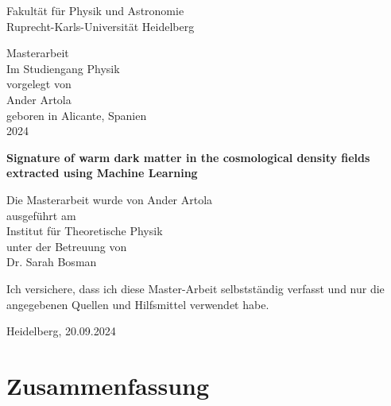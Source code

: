 \documentclass[
     12pt,                    %
     a4paper,             %
     BCOR=10mm,     %
     DIV=14,                 %
     listof=totoc,                    %
     bibliography=totoc,       %
     index=totoc,              %
     twoside,
     headsepline
     ]{scrreprt}
\begin{document}


\thispagestyle{empty}
\begin{center}
  \renewcommand{\baselinestretch}{2.00}
  \Large\sffamily
  Fakult\"{a}t f\"{u}r Physik und Astronomie\\
  \large
  Ruprecht-Karls-Universit\"{a}t Heidelberg
  \par\vfill\normalfont
  Masterarbeit\\
  Im Studiengang Physik\\
  vorgelegt von\\
  Ander Artola\\
  geboren in Alicante, Spanien \\
  2024\\
\end{center}
\newpage

\thispagestyle{empty}
\begin{center}
  \renewcommand{\baselinestretch}{2.00}
  \Large\bfseries\sffamily
  Signature of warm dark matter in the
  cosmological density fields extracted using
  Machine Learning
  \par
  \vfill
  \large\normalfont
  Die Masterarbeit wurde von Ander Artola\\
  ausgef\"{u}hrt am\\
  Institut f\"{u}r Theoretische Physik\\
  unter der Betreuung von\\
  Dr. Sarah Bosman
\end{center}\par
\vspace{5\baselineskip}

\renewcommand{\baselinestretch}{1.00}\normalsize

\onehalfspacing

\thispagestyle{empty}

\vspace*{100pt}
\noindent
Ich versichere, dass ich diese Master-Arbeit selbstständig verfasst und nur die angegebenen
Quellen und Hilfsmittel verwendet habe.

\vspace*{50pt}

\noindent
Heidelberg, 20.09.2024
\cleardoublepage

\section*{Zusammenfassung}
\end{document}
